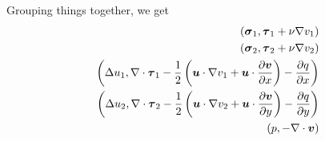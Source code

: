\documentclass{article}
\begin{document}
Grouping things together, we get
\begin{align*}
  \left( \boldsymbol\sigma_1,\boldsymbol\tau_1+\nu\nabla v_1 \right)\\
  \left( \boldsymbol\sigma_2,\boldsymbol\tau_2+\nu\nabla v_2 \right)\\
  \left( \Delta u_1,\nabla\cdot\boldsymbol\tau_1
  -\frac{1}{2}\left( \boldsymbol u\cdot\nabla v_1
  +\boldsymbol u\cdot\frac{\partial\boldsymbol v}{\partial x} \right)
  -\frac{\partial q}{\partial x} \right)\\
  \left( \Delta u_2,\nabla\cdot\boldsymbol\tau_2
  -\frac{1}{2}\left( \boldsymbol u\cdot\nabla v_2
  +\boldsymbol u\cdot\frac{\partial\boldsymbol v}{\partial y} \right)
  -\frac{\partial q}{\partial y} \right)\\
  \left( p,-\nabla\cdot\boldsymbol v \right)
\end{align*}
\end{document}
